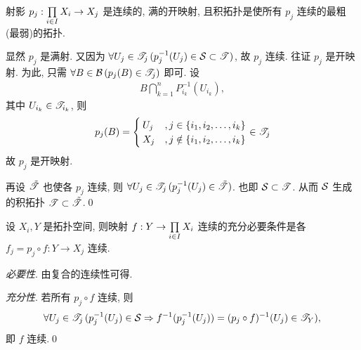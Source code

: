     \begin{Theorem}
        射影 $ p_{j}:\Prod{i\in I}{}X_{i}\to X_{j} $ 是连续的, 满的开映射, 且积拓扑是使所有 $ p_{j} $ 连续的最粗(最弱)的拓扑.
    \end{Theorem}
    \begin{Proof}
        显然 $ p_{j} $ 是满射. 又因为 $ \forall U_{j}\in\ST_{j}\,(p_{j}^{-1}(U_{j})\in\CS\subset\ST) $, 故 $ p_{j} $ 连续. 往证 $ p_{j} $ 是开映射. 为此, 只需 $ \forall B\in\CB\,(p_{j}(B)\in\ST_{j}) $ 即可. 设
        \begin{align*}
            B\bigcap_{k=1}^{n}P_{i_{k}}^{-1}(U_{i_{k}}),
        \end{align*}
        其中 $ U_{i_{k}}\in\ST_{i_{k}} $, 则
        \begin{align*}
            p_{j}(B)=\begin{cases}
                U_{j} & , j\in\set{\seq[k]{i}}\\
                X_{j} & , j\notin\set{\seq[k]{i}}
            \end{cases}\in \ST_{j}
        \end{align*}
        故 $ p_{j} $ 是开映射.

        再设 $ \tilde{\ST} $ 也使各 $ p_{j} $ 连续, 则 $ \forall U_{j}\in\ST_{j}\,(p_{j}^{-1}(U_{j})\in\tilde{\ST}) $. 也即 $ \CS\subset\ST $. 从而 $ \CS $ 生成的积拓扑 $ \ST\subset\tilde{\ST} $.\qed
    \end{Proof}
    
    \begin{Theorem}[连续映射的投影刻画]
        设 $ X_{i}, Y $ 是拓扑空间, 则映射 $ f: Y\to \Prod{i\in I}{}X_{i} $ 连续的充分必要条件是各 $ f_{j}=p_{j}\circ f: Y\to X_{j} $ 连续.
        \begin{center}
        \end{center}
    \end{Theorem}
    \begin{Proof}
        \textsl{必要性}. 由复合的连续性可得.

        \textsl{充分性}. 若所有 $ p_{j}\circ f $ 连续, 则
        \begin{align*}
            \forall U_{j}\in\ST_{j}\,(p_{j}^{-1}(U_{j})\in\CS\Rightarrow f^{-1}(p_{j}^{-1}(U_{j}))=(p_{j}\circ f)^{-1}(U_{j})\in\ST_{Y}),
        \end{align*}
        即 $ f $ 连续.\qed
    \end{Proof}

